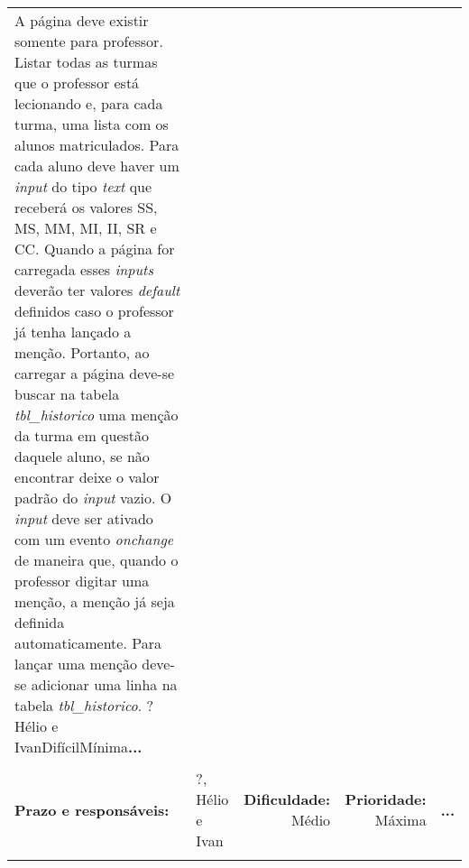 \documentclass{article}
\newcommand{\pendente}{\textbf{...}}
\newenvironment{tarefas}{\begin{longtable}{llrrr}}{\end{longtable}}
\newcommand{\tarefa}[7]{
  \multicolumn{5}{l}{\parbox{15cm}{\textbf{Tarefa} \emph{#1}\\ #2}}
	\\\\\hline\textbf{Prazo e responsáveis:} & #3, #4 & \textbf{Dificuldade:} #5 & \textbf{Prioridade:} #6 & #7\\\hline\\
}
\begin{document}
\begin{tarefas}
{	    A página deve existir somente para professor. Listar todas as turmas que o professor está lecionando e, para cada turma, uma lista com os alunos matriculados. Para cada aluno deve haver um \textit{input} do tipo \textit{text} que receberá os valores SS, MS, MM, MI, II, SR e CC. Quando a página for carregada esses \textit{inputs} deverão ter valores \textit{default} definidos caso o professor já tenha lançado a menção. Portanto, ao carregar a página deve-se buscar na tabela \textit{tbl\_historico} uma menção da turma em questão daquele aluno, se não encontrar deixe o valor padrão do \textit{input} vazio. O \textit{input} deve ser ativado com um evento \textit{onchange} de maneira que, quando o professor digitar uma menção, a menção já seja definida automaticamente. Para lançar uma menção deve-se adicionar uma linha na tabela \textit{tbl\_historico}.
	  }{?}{Hélio e Ivan}{Difícil}{Mínima}{\pendente}
	  \tarefa{Implementar Gerenciar turmas}{
	    A página deve existir somente para coordenador de departamento. Listar todas as turmas do departamento do coordenador. Para cada turma deve haver o botão remover. Ao clicar no botão de remover as seguintes ações devem ocorrer:
	    \begin{itemize}
	      \item Deve-se deletar todas as linhas referentes à turma em questão, usando o \textit{ID} da turma na tabela \textit{tbl\_turmas\_horarios}
	      \item Deve-se deletar todas as linhas referentes à turma em questão da tabela \textit{tbl\_turmas\_matricula}
	      \item Deve-se deletar a linha da turma da tabela \textit{tbl\_turmas}
	    \end{itemize}
	    No início da página deve haver um formulário para adicionar uma nova turma. Esse formulário deve ter os campos: \textit{letra}, \textit{professor}, \textit{vagas}, \textit{ID\_MATERIA} (identificador da matéria a se criar uma turma), uma matriz de horários como \textit{input} do tipo \textit{checkbox} e um botão de submissão. Ao clicar no botão as seguintes ações devem ocorrer:
	    \begin{itemize}
	      \item Verificar se a matéria pertence ao departamento do coordenador
	      \item Adicionar a turma na tabela \textit{tbl\_turmas}
	      \item Adicionar o horário da matriz na tabela \textit{tbl\_turmas\_horarios}
	    \end{itemize}
	  }{?}{Hélio e Ivan}{Médio}{Máxima}{\pendente}
	\end{tarefas}
\end{document}
